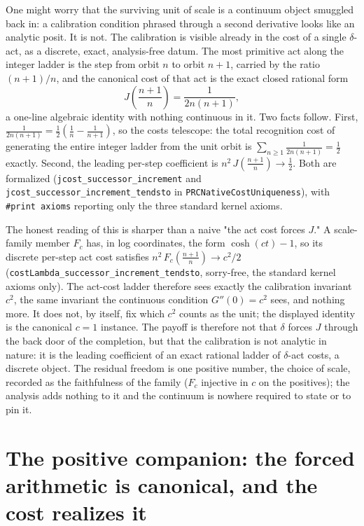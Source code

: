 \documentclass[11pt,a4paper]{article}
\theoremstyle{definition}
\theoremstyle{remark}
\begin{document}
One might worry that the surviving unit of scale is a continuum object smuggled
back in: a calibration condition phrased through a second derivative looks like an
analytic posit. It is not. The calibration is visible already in the cost of a
single $\delta$-act, as a discrete, exact, analysis-free datum. The most primitive
act along the integer ladder is the step from orbit $n$ to orbit $n+1$, carried by
the ratio $(n+1)/n$, and the canonical cost of that act is the exact closed
rational form
\[
  J\!\left(\frac{n+1}{n}\right) = \frac{1}{2n(n+1)},
\]
a one-line algebraic identity with nothing continuous in it. Two facts follow.
First, $\tfrac{1}{2n(n+1)} = \tfrac12\!\left(\tfrac1n - \tfrac1{n+1}\right)$, so the
costs telescope: the total recognition cost of generating the entire integer
ladder from the unit orbit is $\sum_{n\ge 1} \tfrac{1}{2n(n+1)} = \tfrac12$
exactly. Second, the leading per-step coefficient is
$n^2\,J\!\left(\tfrac{n+1}{n}\right)\to\tfrac12$. Both are formalized
(\texttt{jcost\_successor\_increment} and
\texttt{jcost\_successor\_increment\_tendsto} in \texttt{PRCNativeCostUniqueness}),
with \verb|#print axioms| reporting only the three standard kernel axioms.

The honest reading of this is sharper than a naive "the act cost forces $J$."
A scale-family member $F_c$ has, in log coordinates, the form $\cosh(ct)-1$, so its
discrete per-step act cost satisfies
$n^2\,F_c\!\left(\tfrac{n+1}{n}\right)\to c^2/2$
(\texttt{costLambda\_successor\_increment\_tendsto}, sorry-free, the standard kernel
axioms only). The act-cost ladder therefore sees exactly the calibration invariant
$c^2$, the same invariant the continuous condition $G''(0)=c^2$ sees, and nothing
more. It does not, by itself, fix which $c^2$ counts as the unit; the displayed
identity is the canonical $c=1$ instance.
The payoff is therefore not that $\delta$ forces $J$ through the back door of the
completion, but that the calibration is not analytic in nature: it is the leading
coefficient of an exact rational ladder of $\delta$-act costs, a discrete object.
The residual freedom is one positive number, the choice of scale, recorded as the
faithfulness of the family ($F_c$ injective in $c$ on the positives); the analysis
adds nothing to it and the continuum is nowhere required to state or to pin it.

\section{The positive companion: the forced arithmetic is canonical, and the cost realizes it}\label{sec:canonical}
\end{document}
